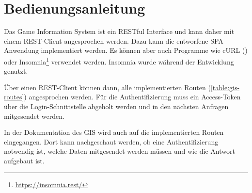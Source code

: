\section{Bedienungsanleitung}

Das Game Information System ist ein RESTful Interface und kann daher mit einem REST-Client angesprochen werden. Dazu kann die entworfene SPA Anwendung implementiert werden. Es können aber auch Programme wie cURL () oder Insomnia\footnote{\url{https://insomnia.rest/}} verwendet werden. Insomnia wurde während der Entwicklung genutzt.

Über einen REST-Client können dann, alle implementierten Routen (\ref{table:gis-routes}) angesprochen werden. Für die Authentifizierung muss ein Access-Token über die Login-Schnittstelle abgeholt werden und in den nächsten Anfragen mitgesendet werden.

In der Dokumentation des GIS wird auch auf die implementierten Routen eingegangen. Dort kann nachgeschaut werden, ob eine Authentifizierung notwendig ist, welche Daten mitgesendet werden müssen und wie die Antwort aufgebaut ist.